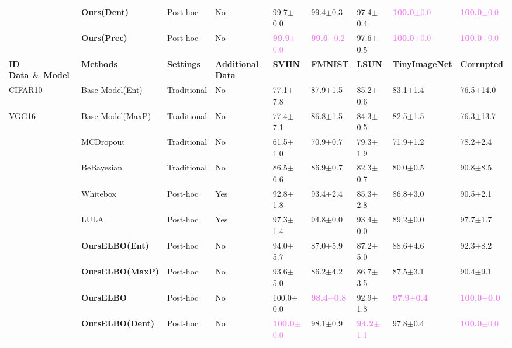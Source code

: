 \begin{table}[h]
\begin{center}
\begin{tabular}{lllllllll}
              & \textbf{Ours(Dent)} & Post-hoc & No & 99.7$\pm$0.0 & 99.4$\pm$0.3 & 97.4$\pm$0.4 &  \textcolor{violet}{\textbf{100.0}$\pm$0.0} & \textcolor{violet}{\textbf{100.0}$\pm$0.0} \\
              & \textbf{Ours(Prec)} & Post-hoc & No & \textcolor{violet}{\textbf{99.9}$\pm$0.0} & \textcolor{violet}{\textbf{99.6}$\pm$0.2} &97.6$\pm$0.5 &  \textcolor{violet}{\textbf{100.0}$\pm$0.0} & \textcolor{violet}{\textbf{100.0}$\pm$0.0} \\
    \toprule
    \textbf{ID Data}\ \&\ \textbf{Model} & \textbf{Methods} & \textbf{Settings} & \textbf{Additional Data} & \textbf{SVHN}& \textbf{FMNIST} & \textbf{LSUN}& \textbf{TinyImageNet} &\textbf{Corrupted} \\
    \hline
    CIFAR10 & Base Model(Ent) & Traditional & No & 77.1$\pm$7.8 & 87.9$\pm$1.5 & 85.2$\pm$0.6 & 83.1$\pm$1.4 & 76.5$\pm$14.0  \\
    VGG16   & Base Model(MaxP) & Traditional & No & 77.4$\pm$7.1 & 86.8$\pm$1.5 & 84.3$\pm$0.5 & 82.5$\pm$1.5 & 76.3$\pm$13.7   \\
              & MCDropout & Traditional & No & 61.5$\pm$1.0 & 70.9$\pm$0.7 & 79.3$\pm$1.9 & 71.9$\pm$1.2 & 78.2$\pm$2.4   \\
              & BeBayesian & Traditional & No & 86.5$\pm$6.6 & 86.9$\pm$0.7 & 82.3$\pm$0.7 & 80.0$\pm$0.5 & 90.8$\pm$8.5   \\
              & Whitebox & Post-hoc & Yes & 92.8$\pm$1.8 & 93.4$\pm$2.4 & 85.3$\pm$2.8 & 86.8$\pm$3.0 & 90.5$\pm$2.1   \\
              & LULA & Post-hoc & Yes & 97.3$\pm$1.4 & 94.8$\pm$0.0 & 93.4$\pm$0.0 & 89.2$\pm$0.0 & 97.7$\pm$1.7   \\
    \hline
              & \textbf{OursELBO(Ent)} & Post-hoc & No & 94.0$\pm$5.7 & 87.0$\pm$5.9 & 87.2$\pm$5.0 &  88.6$\pm$4.6 & 92.3$\pm$8.2  \\
              & \textbf{OursELBO(MaxP)} & Post-hoc & No & 93.6$\pm$5.0 & 86.2$\pm$4.2 & 86.7$\pm$3.5 &  87.5$\pm$3.1 & 90.4$\pm$9.1  \\
              & \textbf{OursELBO} & Post-hoc & No & 100.0$\pm$0.0 & \textcolor{violet}{\textbf{98.4$\pm$0.8}} & 92.9$\pm$1.8 &  \textcolor{violet}{\textbf{97.9$\pm$0.4}} & \textcolor{violet}{\textbf{100.0$\pm$0.0}}  \\
              & \textbf{OursELBO(Dent)} & Post-hoc & No & \textcolor{violet}{\textbf{100.0}$\pm$0.0} & 98.1$\pm$0.9 & \textcolor{violet}{\textbf{94.2}$\pm$1.1} &  97.8$\pm$0.4 & \textcolor{violet}{\textbf{100.0}$\pm$0.0} \\

\end{tabular}
\end{center}
\end{table}
